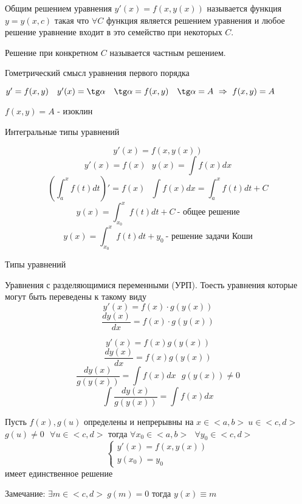 \begin{define}
  Общим решением уравнения $y'(x) = f(x, y(x))$ называется функция $y = y(x,c)$
  такая что $\forall C$ функция является решением уравнения и любое
  решение уравнение входит в это семейство при некоторых $C$.

  Решение при конкретном $C$ называется частным решением.
\end{define}

\begin{title}[\Large]
  Гометрический смысл уравнения первого порядка
\end{title}

\begin{define}[изоклина]
  $y' = f(x,y) ~~~ y'(x) = \tg \alpha ~~~ \tg \alpha = f(x,y) ~~~
  \tg \alpha = A ~ \Rightarrow ~ f(x,y) = A$

  $f(x, y) = A$ - изоклин
\end{define}

\begin{title}[\Large]
  Интегральные типы уравнений
\end{title}

$$
y'(x) = f(x, y(x))
$$
$$
y'(x) = f(x) ~~~ y(x) = \int f(x)dx
$$
$$
\left( \int_a^x f(t) dt \right)' = f(x) ~~~ \int f(x)dx = \int_a^x f(t)dt + C
$$
$$
y(x) = \int_{x_0}^x f(t)dt + C ~ \text{- общее решение}
$$
$$
y(x) = \int_{x_0}^x f(t)dt + y_0 ~ \text{- решение задачи Коши}
$$

\begin{title}[\Large]
  Типы уравнений
\end{title}

\begin{define}
  Уравнения с разделяющимися переменными (УРП). Тоесть уравнения которые
  могут быть переведены к такому виду
  $$
  y'(x) = f(x) \cdot g(y(x))
  $$
  $$
  \frac{dy(x)}{dx} = f(x) \cdot g(y(x))
  $$
\end{define}

\begin{block}
  $$
  y'(x) = f(x)g(y(x))
  $$
  $$
  \frac{dy(x)}{dx} = f(x) g(y(x))
  $$
  $$
  \frac{dy(x)}{g(y(x))} = \int f(x)dx ~~~ g(y(x)) \not= 0
  $$
  $$
  \int \frac{dy(x)}{g(y(x))} = \int f(x)dx
  $$
\end{block}

\begin{theorem}
  Пусть $f(x), g(u)$ определены и непрерывны на $x \in <a, b> ~ u \in <c, d>$
  $g(u) \not= 0 ~~~ \forall u \in <c, d>$ тогда
  $\forall x_0 \in <a, b> ~~~ \forall y_0 \in <c, d>$
  $$
  \left\{
  \begin{array}{l}
    y'(x) = f(x, y(x)) \\
    y(x_0) = y_0
  \end{array}
  \right.
  $$
  имеет единственное решение

  Замечание: $\exists m \in <c, d> ~ g(m) = 0$ тогда $y(x) \equiv m$
\end{theorem}

